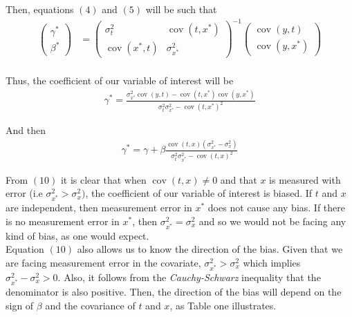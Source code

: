 \documentclass[10pt]{article}
\begin{document}
            Then, equations $(4)$ and $(5)$ will be such that
            \begin{align}
                    \left(\begin{array}{l}
                {\gamma}^* \\
                {\beta}^*
                \end{array}\right)&=\left(\begin{array}{cc}
                {\sigma}^2_{t} & \operatorname{cov}({t,x^*}) \\
                \operatorname{cov}({x^*,t}) & {\sigma}_{x^*}^2
                \end{array}\right)^{-1}\left(\begin{array}{c}
                \operatorname{cov}{(y,t)} \\
                \operatorname{cov}{(y,x^*)}
                \end{array}\right) \\
                \end{align}
            
            Thus, the coefficient of our variable of interest will be
            \begin{align}
            {\gamma}^* =\frac{\sigma_{x^*}^2\operatorname{cov}{(y,t)}-\operatorname{cov}({t,x^*})\operatorname{cov}{(y,x^*)}}{\sigma_{t}^2\sigma_{x^*}^2-\operatorname{cov}({t,x^*})^2}
        \end{align}
        
        And then
        \begin{align}
            \gamma^* = \gamma + \beta\frac{\operatorname{cov}(t,x)(\sigma^2_{x^*}-\sigma^2_x)}{\sigma_{t}^2\sigma_{x^*}^2-\operatorname{cov}({t,x})^2}
        \end{align}
        
        From $(10)$ it is clear that when $\operatorname{cov}(t,x)\neq 0$ and that $x$ is measured with error (i.e $\sigma_{x^*}^2>\sigma_x^2)$, the coefficient of our variable of interest is biased. If $t$ and $x$ are independent, then measurement error in $x^*$ does not cause any bias. If there is no measurement error in $x^*$, then $\sigma^2_{x^*}=\sigma^2_x$ and so we would not be facing any kind of bias, as one would expect.\\
        
        Equation $(10)$ also allows us to know the direction of the bias. Given that we are facing measurement error in the covariate, $\sigma^2_{x^*}>\sigma^2_x$ which implies $\sigma^2_{x^*}-\sigma^2_x>0$. Also, it follows from the \textit{Cauchy-Schwarz} inequality that the denominator is also positive. Then, the direction of the bias will depend on the sign of $\beta$ and the covariance of $t$ and $x$, as Table one illustrates.
        
\end{document}
